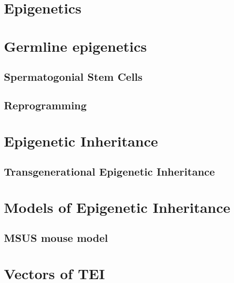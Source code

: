 \documentclass[12pt,twoside]{reedthesis}
\begin{document}
\hypertarget{epigenetics}{%
\section{Epigenetics}\label{epigenetics}}

\hypertarget{germline-epigenetics}{%
\section{Germline epigenetics}\label{germline-epigenetics}}

\hypertarget{spermatogonial-stem-cells}{%
\subsection{Spermatogonial Stem Cells}\label{spermatogonial-stem-cells}}

\hypertarget{reprogramming}{%
\subsection{Reprogramming}\label{reprogramming}}

\hypertarget{epigenetic-inheritance}{%
\section{Epigenetic Inheritance}\label{epigenetic-inheritance}}

\hypertarget{transgenerational-epigenetic-inheritance}{%
\subsection{Transgenerational Epigenetic Inheritance}\label{transgenerational-epigenetic-inheritance}}

\hypertarget{models-of-epigenetic-inheritance}{%
\section{Models of Epigenetic Inheritance}\label{models-of-epigenetic-inheritance}}

\hypertarget{msus-mouse-model}{%
\subsection{MSUS mouse model}\label{msus-mouse-model}}

\hypertarget{vectors-of-tei}{%
\section{Vectors of TEI}\label{vectors-of-tei}}
\end{document}
